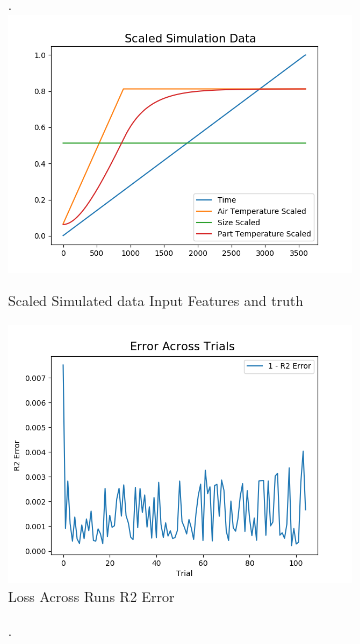 \begin{figure}[ht]
    \begin{subfigure}{.5\linewidth}.
        \centering
    	\includegraphics[width=\linewidth]{lstm/sime_data_scaling.png}
        \caption{Scaled Simulated data Input Features and truth}
    \end{subfigure}
    \begin{subfigure}{.5\linewidth}
    	\centering
    	\includegraphics[width=\linewidth]{lstm/error.png}
    	\caption{Loss Across Runs R2 Error}	
    \end{subfigure}\par\medskip
    \begin{subfigure}{.5\linewidth}.
        \centering

\end{subfigure}
\end{figure}
